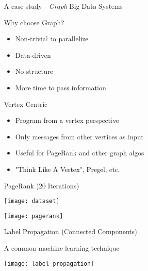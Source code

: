 \begin{frame}[t]{A case study - \textit{Graph} Big Data Systems}

  \vspace{0.5cm}

  Why choose Graph?

  \begin{itemize}
    \item Non-trivial to parallelize
    \item Data-driven
    \item No structure
    \item More time to pass information
  \end{itemize}

  \vspace{0.5cm}

  \pause

  Vertex Centric

  \begin{itemize}
    \item Program from a vertex perspective
    \item Only messages from other vertices as input
    \item Useful for PageRank and other graph algos
    \item "Think Like A Vertex", Pregel, etc.
  \end{itemize}

  \vspace{0.5cm}
\end{frame}

\begin{frame}[t]{PageRank (20 Iterations)}
  \begin{center}
    \texttt{[image: dataset]}
  \end{center}
  
  \vspace{0.5cm}

  \begin{center}
    \texttt{[image: pagerank]}
  \end{center}
\end{frame}

\begin{frame}{Label Propagation (Connected Components)}

  \vspace{0.25cm}

  A common machine learning technique

  \vspace{0.5cm}

  \begin{center}
    \texttt{[image: label-propagation]}
  \end{center}
\end{frame}
